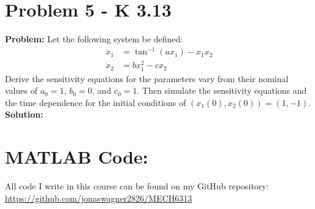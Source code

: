 \documentclass[letter]{article}
\begin{document}
\newpage
\section{Problem 5 - K 3.13}
\textbf{Problem:}
Let the following system be defined:
\begin{equation}
	\begin{aligned}
		\dot{x}_1 &= \tan^{-1}(ax_1) - x_1 x_2\\
		\dot{x}_2 &= b x_1^2 - c x_2
	\end{aligned}
\end{equation}
Derive the sensitivity equations for the parameters vary from their nominal values of $a_0 = 1$, $b_0 = 0$, and $c_0 = 1$. Then simulate the sensitivity equations and the time dependence for the initial conditions of $(x_1(0), x_2(0)) = (1,-1)$.\\

\noindent
\textbf{Solution:}










\newpage
\appendix
\section{MATLAB Code:}
All code I write in this course can be found on my GitHub repository:\\
\href{https://github.com/jonaswagner2826/MECH6313}{https://github.com/jonaswagner2826/MECH6313}

\end{document}
